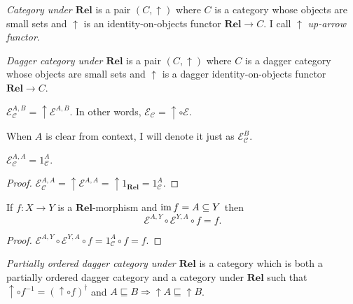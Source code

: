 \begin{defn}
\emph{Category under $\mathbf{Rel}$} is a pair $(C , \uparrow)$
where $C$ is a category whose objects are small sets and $\uparrow$ is an
identity-on-objects functor $\mathbf{Rel} \rightarrow C$. I call
$\uparrow$ \emph{up-arrow functor}.
\end{defn}

\begin{defn}
  \emph{Dagger category under $\mathbf{Rel}$} is a pair $(C ,
  \uparrow)$ where $C$ is a dagger category whose objects are small sets and
  $\uparrow$ is a dagger identity-on-objects functor $\mathbf{Rel}
  \rightarrow C$.
\end{defn}

\begin{defn}
  $\mathcal{E}_{\mathcal{C}}^{A,B} = \uparrow \mathcal{E}^{A,B}$. In
  other words, $\mathcal{E}_{\mathcal{C}} = \uparrow \circ \mathcal{E}$.
  
  When $A$ is clear from context, I will denote it just as $\mathcal{E}_{\mathcal{C}}^B$.
\end{defn}

\begin{prop}
  $\mathcal{E}_{\mathcal{C}}^{A,A} = 1_{\mathcal{C}}^A$.
\end{prop}

\begin{proof}
  $\mathcal{E}_{\mathcal{C}}^{A,A} = \uparrow \mathcal{E}^{A,A} =
  \uparrow 1_{\mathbf{Rel}} = 1_{\mathcal{C}}^A$.
\end{proof}

\begin{prop}
  If $f : X \rightarrow Y$ is a $\mathbf{Rel}$-morphism and
  $\operatorname{im} f = A \subseteq Y$ then
  \[ \mathcal{E}^{A,Y} \circ \mathcal{E}^{Y,A} \circ f = f. \]
\end{prop}

\begin{proof}
  $\mathcal{E}^{A,Y} \circ \mathcal{E}^{Y,A} \circ f = 1_{\mathcal{C}}^A
  \circ f = f$.
\end{proof}

\begin{defn}
  \emph{Partially ordered dagger category under $\mathbf{Rel}$} is
  a category which is both a partially ordered dagger category and a category
  under $\mathbf{Rel}$ such that $\uparrow \circ f^{- 1} = (\uparrow
  \circ f)^{\dagger}$ and $A \sqsubseteq B \Rightarrow \uparrow A \sqsubseteq
  \uparrow B$.
\end{defn}

